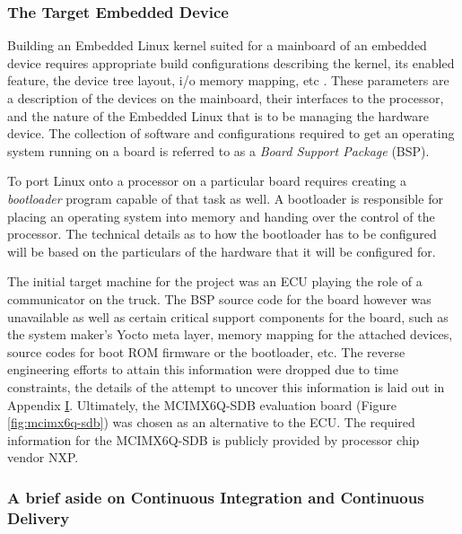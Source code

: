 \subsubsection{The Target Embedded Device}

Building an Embedded Linux kernel suited for a mainboard of an embedded device requires appropriate build configurations describing the kernel, its enabled feature, the device tree layout, i/o memory mapping, etc \cite{bootlin-port}. These parameters are a description of the devices on the mainboard, their interfaces to the processor, and the nature of the Embedded Linux that is to be managing the hardware device. The collection of software and configurations required to get an operating system running on a board is referred to as a \textit{Board Support Package} (BSP).

To port Linux onto a processor on a particular board requires creating a \textit{bootloader} program capable of that task as well. A bootloader is responsible for placing an operating system into memory and handing over the control of the processor. The technical details as to how the bootloader has to be configured will be based on the particulars of the hardware that it will be configured for.

The initial target machine for the project was an ECU playing the role of a communicator on the truck. The BSP source code for the board however was unavailable as well as certain critical support components for the board, such as the system maker's Yocto meta layer, memory mapping for the attached devices, source codes for boot ROM firmware or the bootloader, etc. The reverse engineering efforts to attain this information were dropped due to time constraints, the details of the attempt to uncover this information is laid out in Appendix \hyperref[rtc-c300]{I}. Ultimately, the MCIMX6Q-SDB evaluation board (Figure \ref{fig:mcimx6q-sdb}) was chosen as an alternative to the ECU. The required information for the MCIMX6Q-SDB is publicly provided by processor chip vendor NXP.

\subsubsection{A brief aside on Continuous Integration and Continuous Delivery}

